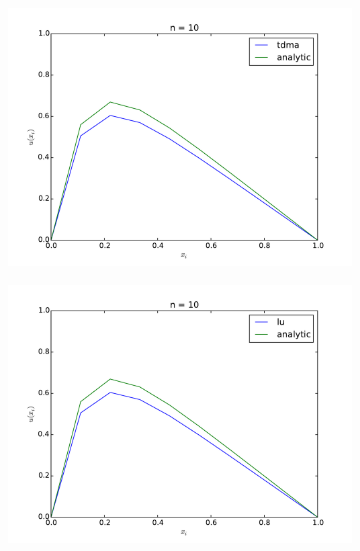 \documentclass[10pt,a4paper]{amsart}
\begin{document}
\begin{figure}[htb]
  \label{fig:results}
  \caption{Numerical approximation for various $n$}
  \centering
  \begin{subfigure}{0.3\textwidth}
    \includegraphics[width=\textwidth]{../plots/tdma_10} 
  \end{subfigure}
  \begin{subfigure}{0.3\textwidth}
    \includegraphics[width=\textwidth]{../plots/lu_10} 
  \end{subfigure}
  \\
  \begin{subfigure}{0.3\textwidth}

\end{subfigure}
\end{figure}
\end{document}

